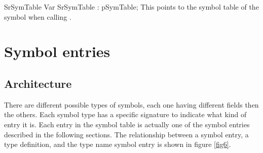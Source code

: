\documentclass [a4paper,12pt]{article}
\begin{document}
\begin{variable}{SrSymTable}
\Declaration
Var SrSymTable : pSymTable;
\Description
This points to the symbol table of the symbol  when calling
.
\end{variable}

\section{Symbol entries}
\label{sec:mylabel3}

\subsection{Architecture}
\label{subsec:architecturees}

There are different possible types of symbols, each one having different
fields then the others. Each symbol type has a specific signature to
indicate what kind of entry it is. Each entry in the symbol table is
actually one of the symbol entries described in the following sections. The
relationship between a symbol entry, a type definition, and the type name
symbol entry is shown in figure \ref{fig6}.
\end{document}
